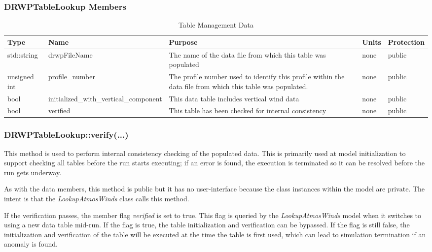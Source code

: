 \documentclass[11pt,fleqn]{report}
\begin{document}
\subsubsection{DRWPTableLookup Members}
\begin{longtable}{|p{2.0cm}|p{3.4cm}|p{5cm}|p{1.0cm}|p{2.0cm}|}
\caption{Table Management Data}\\
\hline
\textbf{Type} & \textbf{Name} & \textbf{Purpose} & \textbf{Units} & \textbf{Protection}\\
\hline
std::string & drwpFileName & The name of the data file from which this table
was populated & none & public \\
\hline
unsigned int & profile\_number & The profile number used to identify this
profile within the data file from which this table was populated. & none &
public \\
\hline
bool & initialized\_with\_\hspace{0.5cm}vertical\_component & This data table includes
vertical wind data & none & public \\
\hline
bool & verified & This table has been checked for internal consistency &
none & public \\
\hline
\end{longtable}

\subsubsection{DRWPTableLookup::verify(...)}
This method is used to perform internal consistency checking of the
populated data. This is primarily used at model initialization to support
checking all tables before the run starts executing; if an error is found,
the execution is terminated so it can be resolved before the run gets
underway.

As with the data members, this method is public but it has no user-interface
because the class instances within the model are private. The intent is that
the \textit{LookupAtmosWinds} class calls this method.

If the verification passes, the member flag \textit{verified} is set to
true. This flag is queried by the \textit{LookupAtmosWinds} model when it
switches to using a new data table mid-run. If the flag is true, the table
initialization and verification can be bypassed. If the flag is still false,
the initialization and verification of the table will be executed at the
time the table is first used, which can lead to simulation termination if an
anomaly is found.
\end{document}
